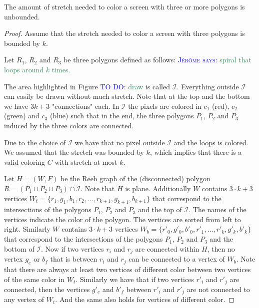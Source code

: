 \documentclass[a4paper, UKenglish]{lipics-v2018}
\newcommand{\mremark}[3]{\textcolor{blue}{\textsc{#1 #2:}} \textcolor{SeaGreen}{\textsf{#3}}}
\newcommand{\jerome}[2][says]{\mremark{J\'er\^ome}{#1}{#2}}
\newcommand{\todo}[2][DO]{\mremark{TO}{#1}{#2}}
\newcommand{\draw}{\todo{draw}}
\newcommand{\ixi}{\mathcal{I}}
\begin{document}
\begin{theorem}\label{thm:unbouded}
The amount of stretch needed to color a screen with three or more polygons is unbounded.
\end{theorem}
\begin{proof}
Assume that the stretch needed to color a screen with three polygons is bounded by $k$.

Let $R_1$, $R_2$ and $R_3$ be three polygons defined as follows:
\jerome{spiral that loops around $k$ times.}

The area highlighted in Figure \todo{draw} is called $\ixi$.
Everything outside $\ixi$ can easily be drawn without much stretch.
Note that at the top and the bottom we have $3k+3$ "connections" each. In $\ixi$ the pixels are colored in $c_1$ (red), $c_2$ (green) and $c_3$ (blue) such that in the end, the three polygons $P_1$, $P_2$ and $P_3$ induced by the three colors are connected.


Due to the choice of $\ixi$ we have that no pixel outside $\ixi$ and the loops is colored.
We assumed that the stretch was bounded by $k$, which implies that there is a valid coloring $C$ with stretch at most $k$.

Let $H=(W, F)$ be the Reeb graph of the (disconnected) polygon $R=(P_1\cup P_2\cup P_3)\cap \ixi$.
Note that $H$ is plane. Additionally $W$ contains $3\cdot k + 3$ vertices $W_t=\{r_1, g_1, b_1, r_2,\dots, r_{k+1}, g_{k+1}, b_{k+1}\}$ that correspond to the intersections of the polygons $P_1$, $P_2$ and $P_3$ and the top of $\ixi$. The names of the vertices indicate the color of the polygon. The vertices are sorted from left to right.
Similarly $W$ contains $3\cdot k + 3$ vertices $W_b=\textbf{}\{r'_0, g'_0, b'_0, r'_1,\dots, r'_k, g'_k, b'_k\}$ that correspond to the intersections of the polygons $P_1$, $P_2$ and $P_3$ and the bottom of $\ixi$.
Now if two vertices $r_i$ and $r_j$ are connected within $H$, then no vertex $g_e$ or $b_f$ that is between $r_i$ and $r_j$ can be connected to a vertex of $W_b$. Note that there are always at least two vertices of different color between two vertices of the same color in $W_t$.
Similarly we have that if two vertices $r'_i$ and $r'_j$ are connected, then the vertices $g'_e$ and $b'_f$ between $r'_i$ and $r'_j$ are not connected to any vertex of $W_t$.
And the same also holds for vertices of different color.


\end{proof}
\end{document}

